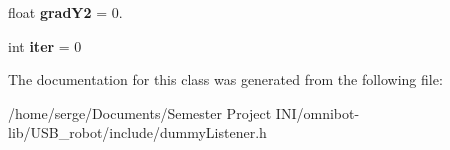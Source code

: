 \begin{DoxyCompactItemize}
\item 
\hypertarget{class_dumb_e_d_v_s4337_listener_aec34e1b8f90744fcd65e5b23809dcbda}{}float {\bfseries grad\+Y2} = 0.\label{class_dumb_e_d_v_s4337_listener_aec34e1b8f90744fcd65e5b23809dcbda}

\item 
\hypertarget{class_dumb_e_d_v_s4337_listener_a7659b4a45469e721b663e5d05f56aa6e}{}int {\bfseries iter} = 0\label{class_dumb_e_d_v_s4337_listener_a7659b4a45469e721b663e5d05f56aa6e}

\end{DoxyCompactItemize}


The documentation for this class was generated from the following file\+:\begin{DoxyCompactItemize}
\item 
/home/serge/\+Documents/\+Semester Project I\+N\+I/omnibot-\/lib/\+U\+S\+B\+\_\+robot/include/dummy\+Listener.\+h\end{DoxyCompactItemize}
